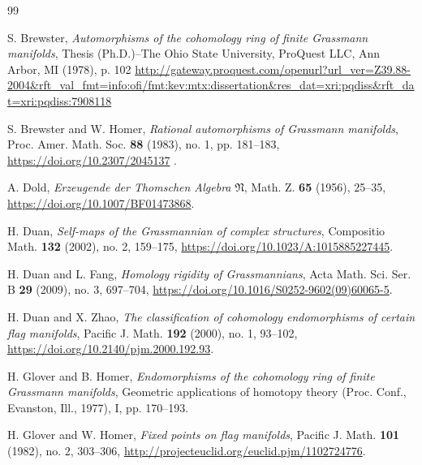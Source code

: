 \documentclass{amsart}
\begin{document}
\begin{thebibliography}{99}

 S. Brewster, \textit{Automorphisms of the cohomology ring of finite Grassmann manifolds}, %
Thesis (Ph.D.)--The Ohio State University, ProQuest LLC, Ann Arbor, MI (1978), p. 102 \url{http://gateway.proquest.com/openurl?url_ver=Z39.88-2004&rft_val_fmt=info:ofi/fmt:kev:mtx:dissertation&res_dat=xri:pqdiss&rft_dat=xri:pqdiss:7908118}
	
 S. %
Brewster and W. Homer, \textit{Rational automorphisms of Grassmann manifolds}, Proc. Amer. Math. Soc. \textbf{88} (1983), no. %
1, pp. 181--183, \url{https://doi.org/10.2307/2045137}%
.
	
 A. Dold, \textit{Erzeugende der Thomschen Algebra }$\mathfrak{N}$, Math. Z. \textbf{65} (1956), 25--35, \url{https://doi.org/10.1007/BF01473868}.

 H. Duan, \textit{Self-maps of the Grassmannian of complex structures}, Compositio Math. \textbf{132} (2002), no. 2, 159--175, \url{https://doi.org/10.1023/A:1015885227445}.
	
 H. Duan and L. Fang, \textit{Homology rigidity of Grassmannians}, Acta Math. Sci. Ser. B \textbf{29} (2009), no. 3, 697--704, \url{https://doi.org/10.1016/S0252-9602(09)60065-5}.

 H. Duan and X. Zhao, \textit{The classification of cohomology endomorphisms of certain flag manifolds}, Pacific J. Math. \textbf{192} (2000), no. 1, 93--102, \url{https://doi.org/10.2140/pjm.2000.192.93}.
	
 H. Glover and B. Homer, \textit{Endomorphisms of the cohomology ring of finite Grassmann manifolds}, Geometric applications of homotopy theory (Proc. Conf., Evanston, Ill., 1977), I, pp. 170--193.
	
 H. Glover and W. Homer, \textit{Fixed points on flag manifolds}, Pacific J. Math. \textbf{101} (1982), no. 2, 303--306, \url{http://projecteuclid.org/euclid.pjm/1102724776}.
	

\end{thebibliography}
\end{document}

